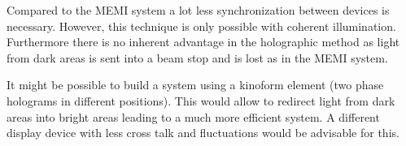 Compared to the MEMI system a lot less synchronization between devices
is necessary. However, this technique is only possible with coherent
illumination. Furthermore there is no inherent advantage in the
holographic method as light from dark areas is sent into a beam stop
and is lost as in the MEMI system.

It might be possible to build a system using a kinoform element (two
phase holograms in different positions). This would allow to redirect
light from dark areas into bright areas leading to a much more
efficient system. A different display device with less cross talk
and fluctuations would be advisable for this.

